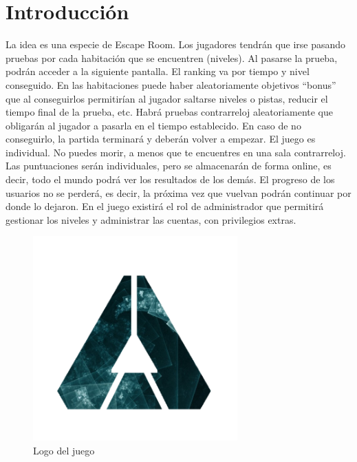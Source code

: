 \section{Introducción}\label{sec:intro}


La idea es una especie de Escape Room. Los jugadores tendrán que irse pasando pruebas por cada habitación que se encuentren (niveles). Al pasarse la prueba, podrán acceder a la siguiente pantalla. El ranking va por tiempo y nivel conseguido. En las habitaciones puede haber aleatoriamente objetivos “bonus” que al conseguirlos permitirían al jugador saltarse niveles o pistas, reducir el tiempo final de la prueba, etc.
Habrá pruebas contrarreloj aleatoriamente que obligarán al jugador a pasarla en el tiempo establecido. En caso de no conseguirlo, la partida terminará y deberán volver a empezar.
El juego es individual. No puedes morir, a menos que te encuentres en una sala contrarreloj. 
Las puntuaciones serán individuales, pero se almacenarán de forma online, es decir, todo el mundo podrá ver los resultados de los demás. 
El progreso de los usuarios no se perderá, es decir, la próxima vez que vuelvan podrán continuar por donde lo dejaron.
En el juego existirá el rol de administrador que permitirá gestionar los niveles y administrar las cuentas, con privilegios extras.



\begin{figure}[ht]
  \centering
  \includegraphics[width=0.7\textwidth]{./imatges/logo.png}
  \caption{Logo del juego}
  \label{fig:gamelogo}
\end{figure}
